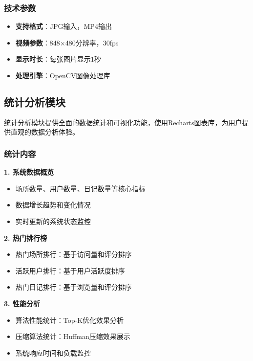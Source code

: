 \documentclass[12pt, a4paper]{article}
\begin{document}
\subsubsection{技术参数}

\begin{itemize}
    \item \textbf{支持格式}：JPG输入，MP4输出
    \item \textbf{视频参数}：848×480分辨率，30fps
    \item \textbf{显示时长}：每张图片显示1秒
    \item \textbf{处理引擎}：OpenCV图像处理库
\end{itemize}

\subsection{统计分析模块}

\begin{successbox}[title={数据可视化分析}]
统计分析模块提供全面的数据统计和可视化功能，使用Recharts图表库，为用户提供直观的数据分析体验。
\end{successbox}

\subsubsection{统计内容}

\textbf{1. 系统数据概览}
\begin{itemize}
    \item 场所数量、用户数量、日记数量等核心指标
    \item 数据增长趋势和变化情况
    \item 实时更新的系统状态监控
\end{itemize}

\textbf{2. 热门排行榜}
\begin{itemize}
    \item 热门场所排行：基于访问量和评分排序
    \item 活跃用户排行：基于用户活跃度排序
    \item 热门日记排行：基于浏览量和评分排序
\end{itemize}

\textbf{3. 性能分析}
\begin{itemize}
    \item 算法性能统计：Top-K优化效果分析
    \item 压缩算法统计：Huffman压缩效果展示
    \item 系统响应时间和负载监控
\end{itemize}
\end{document}
